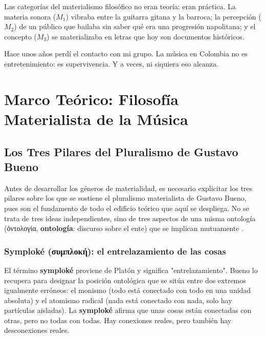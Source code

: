\documentclass[14pt, a4paper]{article}
\begin{document}
Las categorías del materialismo filosófico no eran teoría: eran
práctica. La materia sonora (\(M_1\)) vibraba entre la guitarra gitana
y la barroca; la percepción (\(M_2\)) de un público que bailaba sin
saber qué era una progresión napolitana; y el concepto (\(M_3\)) se
materializaba en letras que hoy son documentos históricos.

Hace unos años perdí el contacto con mi grupo. La música en Colombia
no es entretenimiento: es supervivencia. Y a veces, ni siquiera eso
alcanza.
\section{Marco Teórico: Filosofía Materialista de la Música}
\label{marco-teorico}
\subsection{Los Tres Pilares del Pluralismo de Gustavo Bueno}
\label{tres-pilares}
Antes de desarrollar los géneros de materialidad, es necesario
explicitar los tres pilares sobre los que se sostiene el pluralismo
materialista de Gustavo Bueno, pues son el fundamento de todo el
edificio teórico que aquí se despliega. No se trata de tres ideas
independientes, sino de tres aspectos de una misma ontología
(ὀντολογία, \textbf{ontología}: discurso sobre el ente) que se implican
mutuamente \autocite{bueno1992} \autocite{fgbueno-pluralismo}.
\subsubsection{Symploké (συμπλοκή): el entrelazamiento de las cosas}
\label{symploke-pilar}
El término \textbf{symploké} proviene de Platón y significa
"entrelazamiento". Bueno lo recupera para designar la posición
ontológica que se sitúa entre dos extremos igualmente erróneos: el
monismo (todo está conectado con todo en una unidad absoluta) y el
atomismo radical (nada está conectado con nada, solo hay partículas
aisladas). La \textbf{symploké} afirma que unas cosas están conectadas con
otras, pero no todas con todas. Hay conexiones reales, pero también
hay desconexiones reales.
\end{document}
